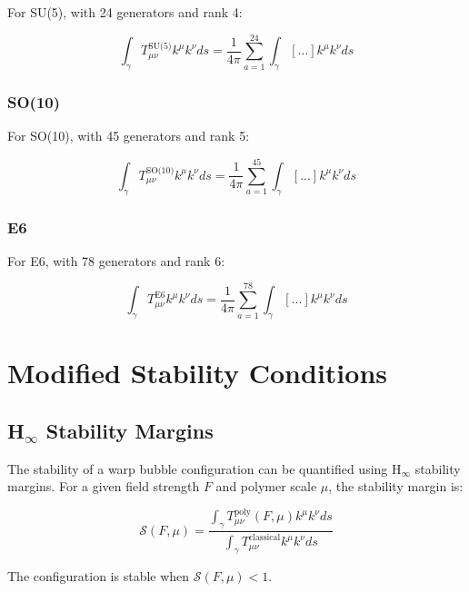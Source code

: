 \documentclass[11pt]{article}
\begin{document}
For SU(5), with 24 generators and rank 4:

\begin{equation}
\int_{\gamma}T^{\text{SU(5)}}_{\mu\nu}k^\mu k^\nu ds = \frac{1}{4\pi}\sum_{a=1}^{24}\int_{\gamma}[...]k^\mu k^\nu ds
\end{equation}

\subsubsection{SO(10)}

For SO(10), with 45 generators and rank 5:

\begin{equation}
\int_{\gamma}T^{\text{SO(10)}}_{\mu\nu}k^\mu k^\nu ds = \frac{1}{4\pi}\sum_{a=1}^{45}\int_{\gamma}[...]k^\mu k^\nu ds
\end{equation}

\subsubsection{E6}

For E6, with 78 generators and rank 6:

\begin{equation}
\int_{\gamma}T^{\text{E6}}_{\mu\nu}k^\mu k^\nu ds = \frac{1}{4\pi}\sum_{a=1}^{78}\int_{\gamma}[...]k^\mu k^\nu ds
\end{equation}

\section{Modified Stability Conditions}

\subsection{H$_\infty$ Stability Margins}

The stability of a warp bubble configuration can be quantified using H$_\infty$ stability margins. For a given field strength $F$ and polymer scale $\mu$, the stability margin is:

\begin{equation}
\mathcal{S}(F,\mu) = \frac{\int_{\gamma}T^{\text{poly}}_{\mu\nu}(F,\mu)k^\mu k^\nu ds}{\int_{\gamma}T^{\text{classical}}_{\mu\nu}k^\mu k^\nu ds}
\end{equation}

The configuration is stable when $\mathcal{S}(F,\mu) < 1$.
\end{document}
